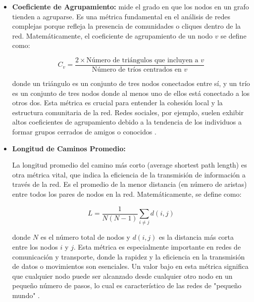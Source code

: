 \begin{itemize}
    \item \textbf{Coeficiente de Agrupamiento:} 
     mide el grado en que los nodos en un grafo tienden a agruparse. Es una métrica fundamental en el análisis de redes complejas porque refleja la presencia de comunidades o cliques dentro de la red. Matemáticamente, el coeficiente de agrupamiento de un nodo \( v \) se define como:

    \[
    C_v = \frac{2 \times \text{Número de triángulos que incluyen a } v}{\text{Número de tríos centrados en } v}
    \]
    
    donde un triángulo es un conjunto de tres nodos conectados entre sí, y un trío es un conjunto de tres nodos donde al menos uno de ellos está conectado a los otros dos. Esta métrica es crucial para entender la cohesión local y la estructura comunitaria de la red. Redes sociales, por ejemplo, suelen exhibir altos coeficientes de agrupamiento debido a la tendencia de los individuos a formar grupos cerrados de amigos o conocidos \citep{watts1998collective}.
    
    \item \textbf{Longitud de Caminos Promedio:} 
    
    La longitud promedio del camino más corto (average shortest path length) es otra métrica vital, que indica la eficiencia de la transmisión de información a través de la red. Es el promedio de la menor distancia (en número de aristas) entre todos los pares de nodos en la red. Matemáticamente, se define como:

    \[
    L = \frac{1}{N(N-1)} \sum_{i \neq j} d(i,j)
    \]

    donde \( N \) es el número total de nodos y \( d(i,j) \) es la distancia más corta entre los nodos \( i \) y \( j \). Esta métrica es especialmente importante en redes de comunicación y transporte, donde la rapidez y la eficiencia en la transmisión de datos o movimientos son esenciales. Un valor bajo en esta métrica significa que cualquier nodo puede ser alcanzado desde cualquier otro nodo en un pequeño número de pasos, lo cual es característico de las redes de "pequeño mundo" \citep{watts1998collective}.


\end{itemize}
